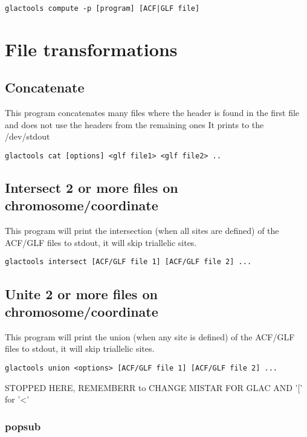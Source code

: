 \documentclass[a4paper]{article}
\begin{document}
\begin{lstlisting}
glactools compute -p [program] [ACF|GLF file]
\end{lstlisting}

\section{File transformations }

\subsection{Concatenate }
\noindent This program concatenates many files where the header is found in the
first file and does not use the headers from the remaining ones
It prints to the /dev/stdout
\begin{lstlisting}
glactools cat [options] <glf file1> <glf file2> .. 
\end{lstlisting}

\subsection{Intersect 2 or more files on chromosome/coordinate}

\noindent This program will print the intersection (when all sites are defined) of the ACF/GLF files to stdout, it will skip triallelic sites.

\begin{lstlisting}
glactools intersect [ACF/GLF file 1] [ACF/GLF file 2] ...
\end{lstlisting}

\subsection{Unite 2 or more files on chromosome/coordinate}

\noindent This program will print the union (when any site is defined) of the ACF/GLF files to stdout, it will skip triallelic sites.

\begin{lstlisting}
glactools union <options> [ACF/GLF file 1] [ACF/GLF file 2] ...
\end{lstlisting}


STOPPED HERE, REMEMBERR to CHANGE MISTAR FOR GLAC AND '[' for '<'

\subsubsection{popsub}
\end{document}
